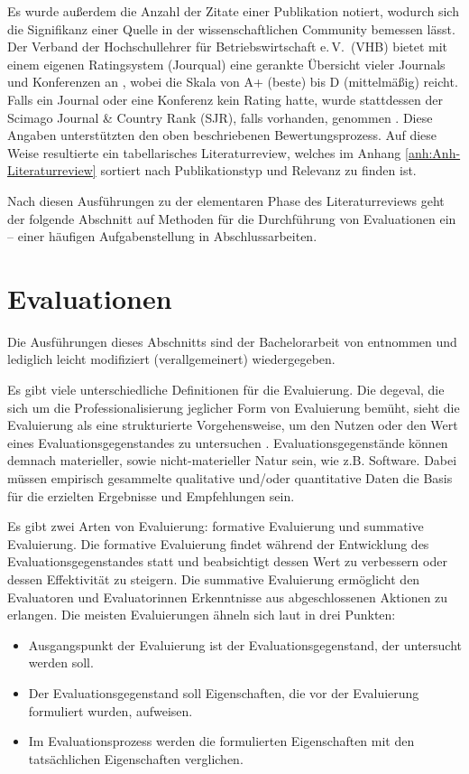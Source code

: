 Es wurde außerdem die Anzahl der Zitate einer Publikation notiert, wodurch sich die
Signifikanz einer Quelle in der wissenschaftlichen Community bemessen lässt. Der
Verband der Hochschullehrer für Betriebswirtschaft e.\,V.~(VHB) bietet mit einem eigenen 
Ratingsystem (Jourqual)
eine gerankte Übersicht vieler Journals und Konferenzen an \parencite[s.][]{VHB2015}, wobei die
Skala von A+ (beste) bis D (mittelmäßig) reicht. Falls ein Journal oder eine Konferenz
kein Rating hatte, wurde stattdessen der Scimago Journal \& Country Rank (SJR), falls
vorhanden, genommen \parencite[s.][]{Scimago2004}. Diese Angaben unterstützten den oben
beschriebenen Bewertungsprozess.
Auf diese Weise resultierte ein tabellarisches Literaturreview, welches im Anhang 
\ref{anh:Anh-Literaturreview} sortiert 
nach Publikationstyp und Relevanz zu finden ist.

Nach diesen Ausführungen zu der elementaren Phase des Literaturreviews geht der folgende Abschnitt auf
Methoden für die Durchführung von Evaluationen ein -- einer häufigen Aufgabenstellung in Abschlussarbeiten.

\section{Evaluationen}
\label{sec:FM-Evaluationen}
%
Die Ausführungen dieses Abschnitts sind der Bachelorarbeit von \textcite{Oezen2018} entnommen und
lediglich leicht modifiziert (verallgemeinert) wiedergegeben.
%

Es gibt viele unterschiedliche Definitionen für die Evaluierung. Die \gls{degeval},
die sich um die Professionalisierung jeglicher Form von Evaluierung
bemüht, sieht die Evaluierung als eine strukturierte Vorgehensweise, um den Nutzen oder den
Wert eines Evaluationsgegenstandes zu untersuchen \parencite[s.][]{degeval2008}. Evaluationsgegenstände 
können demnach materieller, sowie nicht-materieller Natur sein, wie z.B. Software. Dabei müssen empirisch
gesammelte qualitative und/oder quantitative Daten die Basis für die erzielten Ergebnisse und Empfehlungen 
sein. 

Es gibt zwei Arten von Evaluierung: formative Evaluierung und summative Evaluierung. Die formative 
Evaluierung findet
während der Entwicklung des Evaluationsgegenstandes statt und beabsichtigt dessen Wert zu
verbessern oder dessen Effektivität zu steigern. Die summative Evaluierung ermöglicht den
Evaluatoren und Evaluatorinnen Erkenntnisse aus abgeschlossenen Aktionen zu erlangen. Die
meisten Evaluierungen ähneln sich laut \textcite{Hegner2003} in drei Punkten:
\begin{itemize}
\item Ausgangspunkt der Evaluierung ist der Evaluationsgegenstand, der untersucht werden
soll.
\item Der Evaluationsgegenstand soll Eigenschaften, die vor der Evaluierung formuliert
wurden, aufweisen.
\item Im Evaluationsprozess werden die formulierten Eigenschaften mit den tatsächlichen
Eigenschaften verglichen.
\end{itemize}

